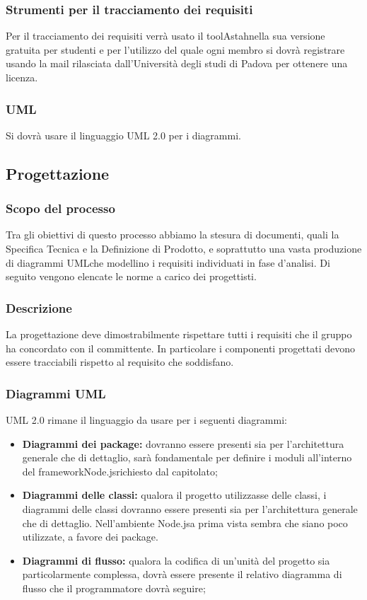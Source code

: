 \documentclass[a4paper,11pt]{article}
\begin{document}
			\subsubsection{Strumenti per il tracciamento dei requisiti}
			Per il tracciamento dei requisiti verrà usato il tool\addglos Astah\addglos nella sua versione gratuita per studenti e per l'utilizzo del quale ogni membro si dovrà registrare usando la mail rilasciata dall'Università degli studi di Padova per ottenere una licenza.  
			\subsubsection{UML}
			Si dovrà usare il linguaggio UML 2.0 per i diagrammi.
		\subsection{Progettazione}
			\subsubsection{Scopo del processo}
			Tra gli obiettivi di questo processo abbiamo la stesura di documenti, quali la Specifica Tecnica e la Definizione di Prodotto, e soprattutto una vasta produzione di diagrammi UML\addglos che modellino i requisiti individuati in fase d'analisi. Di seguito vengono elencate le norme a carico dei progettisti.
			\subsubsection{Descrizione}
			La progettazione deve dimostrabilmente rispettare tutti i requisiti che il gruppo ha concordato con il committente. In particolare i componenti progettati devono essere tracciabili rispetto al requisito che soddisfano.
			\subsubsection{Diagrammi UML}
			UML 2.0 rimane il linguaggio da usare per i seguenti diagrammi:
			\begin{itemize}
			\item\textbf{Diagrammi dei package\addglos:} dovranno essere presenti sia per l'architettura generale che di dettaglio, sarà fondamentale per definire i moduli all'interno del framework\addglos Node.js\addglos richiesto dal capitolato;
			\item\textbf{Diagrammi delle classi:} qualora il progetto utilizzasse delle classi, i diagrammi delle classi dovranno essere presenti sia per l'architettura generale che di dettaglio. Nell'ambiente Node.js\addglos a prima vista sembra che siano poco utilizzate, a favore dei package\addglos.
			\item\textbf{Diagrammi di flusso:} qualora la codifica di un'unità del progetto sia particolarmente complessa, dovrà essere presente il relativo diagramma di flusso che il programmatore dovrà seguire;
			\end{itemize}
\end{document}
